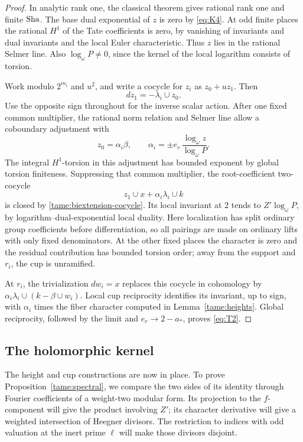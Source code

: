 \begin{proof}
In analytic rank one, the classical theorem gives rational rank one
and finite \(\operatorname{Sha}\). The base dual exponential of \(z\) is zero by
\eqref{eq:K4}. At odd finite places the rational \(H^1\) of the
Tate coefficients is zero, by vanishing of invariants and dual
invariants and the local Euler characteristic. Thus \(z\) lies in
the rational Selmer line. Also \(\log_\omega P\ne0\), since the
kernel of the local logarithm consists of torsion.

Work modulo \(2^{m_i}\) and \(u^2\), and write a cocycle for \(z_i\)
as \(z_0+uz_1\). Then
\[
 dz_1=-\lambda_i\cup z_0.
\]
Use the opposite sign throughout for the inverse scalar action.
After one fixed common multiplier, the rational norm relation and
Selmer line allow a coboundary adjustment with
\[
 z_0=\alpha_i\beta,\qquad
 \alpha_i=\pm e_r\,\frac{\log_\omega z}{\log_\omega P}.
\]
The integral \(H^1\)-torsion in this adjustment has bounded exponent
by global torsion finiteness. Suppressing that common multiplier,
the root-coefficient two-cocycle
\[
 z_1\cup x+\alpha_i\lambda_i\cup k
\]
is closed by \eqref{tame:biextension-cocycle}.
Its local invariant at \(2\) tends to \(Z'\log_\omega P\), by
logarithm--dual-exponential local duality. Here localization has
split ordinary group coefficients before differentiation, so all
pairings are made on ordinary lifts with only fixed denominators.
At the other fixed places the character is zero and the residual
contribution has bounded torsion order; away from the support and
\(r_i\), the cup is unramified.

At \(r_i\), the trivialization \(dw_i=x\) replaces this cocycle in
cohomology by
\(\alpha_i\lambda_i\cup(k-\beta\cup w_i)\).
Local cup reciprocity identifies its invariant, up to sign, with
\(\alpha_i\) times the fiber character computed in
Lemma~\ref{tame:heights}. Global reciprocity, followed by the limit
and \(e_r\to2-a_*\), proves \eqref{eq:T2}.
\end{proof}

\subsection{The holomorphic kernel}

The height and cup constructions are now in place. To prove
Proposition~\ref{tame:spectral}, we compare the two sides of its identity
through Fourier coefficients of a weight-two modular form. Its
projection to the \(f\)-component will give the product involving
\(Z'\); its character derivative will give a weighted intersection of
Heegner divisors. The restriction to indices with odd valuation at the
inert prime \(\ell\) will make those divisors disjoint.

